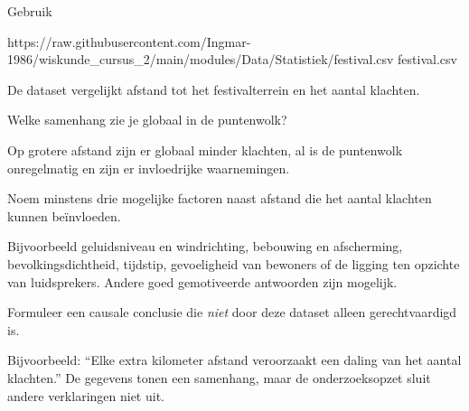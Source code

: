 \documentclass{ximera}
\begin{document}
\begin{oefening}{\oefU \ESS}

Gebruik

\csv
{https://raw.githubusercontent.com/Ingmar-1986/wiskunde_cursus_2/main/modules/Data/Statistiek/festival.csv}
{festival.csv}

De dataset vergelijkt afstand tot het festivalterrein en het aantal
klachten.

\begin{question}
Welke samenhang zie je globaal in de puntenwolk?

\begin{oplossing}
Op grotere afstand zijn er globaal minder klachten, al is de
puntenwolk onregelmatig en zijn er invloedrijke waarnemingen.
\end{oplossing}
\end{question}

\begin{question}
Noem minstens drie mogelijke factoren naast afstand die het aantal
klachten kunnen beïnvloeden.

\begin{oplossing}
Bijvoorbeeld geluidsniveau en windrichting, bebouwing en afscherming,
bevolkingsdichtheid, tijdstip, gevoeligheid van bewoners of de ligging
ten opzichte van luidsprekers. Andere goed gemotiveerde antwoorden zijn
mogelijk.
\end{oplossing}
\end{question}

\begin{question}
Formuleer een causale conclusie die \emph{niet} door deze dataset alleen
gerechtvaardigd is.

\begin{oplossing}
Bijvoorbeeld: ``Elke extra kilometer afstand veroorzaakt een daling
van het aantal klachten.'' De gegevens tonen een samenhang, maar de
onderzoeksopzet sluit andere verklaringen niet uit.
\end{oplossing}
\end{question}

\end{oefening}
\end{document}
